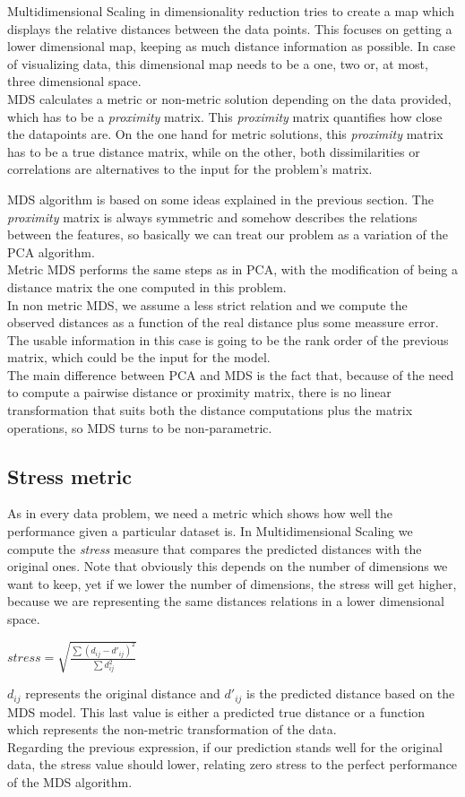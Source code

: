 \documentclass[a4paper,11pt,spanish]{report}
\begin{document}
Multidimensional Scaling \citep{mds} in dimensionality reduction tries to create a map which displays the relative distances between the data points. This focuses on getting a lower dimensional map, keeping as much distance information as possible. In case of visualizing data, this dimensional map needs to be a one, two or, at most, three dimensional space.\\
MDS calculates a metric or non-metric solution depending on the data provided, which has to be a \textit{proximity} matrix. This \textit{proximity} matrix quantifies how close the datapoints are. On the one hand for metric solutions, this \textit{proximity} matrix has to be a true distance matrix, while on the other, both dissimilarities or correlations are alternatives to the input for the problem's matrix.

MDS algorithm is based on some ideas explained in the previous section. The \textit{proximity} matrix is always  symmetric and somehow describes the relations between the features, so basically we can treat our problem as a variation of the PCA algorithm.\\
Metric MDS performs the same steps as in PCA, with the modification of being a distance matrix the one computed in this problem.\\
In non metric MDS, we assume a less strict relation and we compute the observed distances as a function of the real distance plus some meassure error. The usable information in this case is going to be the rank order of the previous matrix, which could be the input for the model.\\
The main difference between PCA and MDS is the fact that, because of the need to compute a pairwise distance or proximity matrix, there is no linear transformation that suits both the distance computations plus the matrix operations, so MDS turns to be non-parametric.

\subsection{Stress metric}
\label{ssec:str}

As in every data problem, we need a metric which shows how well the performance given a particular dataset is. In Multidimensional Scaling we compute the \textit{stress} measure that compares the predicted distances with the original ones. Note that obviously this depends on the number of dimensions we want to keep, yet if we lower the number of dimensions, the stress will get higher, because we are representing the same distances relations in a lower dimensional space.
\begin{center}
\( \textit{stress} = \sqrt{\frac{\sum(d_{ij}-d'_{ij})^{2}}{\sum d_{ij}^{2}} } \)
\end{center}
$d_{ij}$ represents the original distance and $d'_{ij}$ is the predicted distance based on the MDS model. This last value is either a predicted true distance or a function which represents the non-metric transformation of the data.\\
Regarding the previous expression, if our prediction stands well for the original data, the stress value should lower, relating zero stress to the perfect performance of the MDS  algorithm. 
\end{document}
